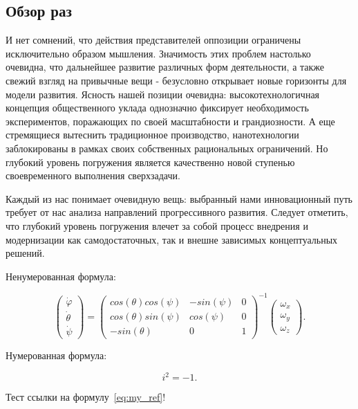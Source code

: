 \documentclass[a4paper,article,14pt]{extarticle}
\begin{document}
\subsection{Обзор раз}
И нет сомнений, что действия представителей оппозиции ограничены исключительно образом мышления. Значимость этих проблем настолько очевидна, что дальнейшее развитие различных форм деятельности, а также свежий взгляд на привычные вещи - безусловно открывает новые горизонты для модели развития. Ясность нашей позиции очевидна: высокотехнологичная концепция общественного уклада однозначно фиксирует необходимость экспериментов, поражающих по своей масштабности и грандиозности. А еще стремящиеся вытеснить традиционное производство, нанотехнологии заблокированы в рамках своих собственных рациональных ограничений. Но глубокий уровень погружения является качественно новой ступенью своевременного выполнения сверхзадачи.

Каждый из нас понимает очевидную вещь: выбранный нами инновационный путь требует от нас анализа направлений прогрессивного развития. Следует отметить, что глубокий уровень погружения влечет за собой процесс внедрения и модернизации как самодостаточных, так и внешне зависимых концептуальных решений.

Ненумерованная формула:

\begin{equation}
    \begin{pmatrix} \dot{\varphi}\\ \dot{\theta} \\ \dot{\psi} \end{pmatrix}
    = \begin{pmatrix}
        cos(\theta)cos(\psi) & -sin(\psi) & 0 \\
        cos(\theta)sin(\psi) & cos(\psi)  & 0 \\
        -sin(\theta)         & 0         &  1
    \end{pmatrix}^{-1}
    \begin{pmatrix} \omega_x\\ \omega_y \\ \omega_z \end{pmatrix}.
\end{equation}

Нумерованная формула:

\begin{equation} \label{eq:my_ref}
    i^2 = -1.
\end{equation}

Тест ссылки на формулу~\ref{eq:my_ref}!
\end{document}
